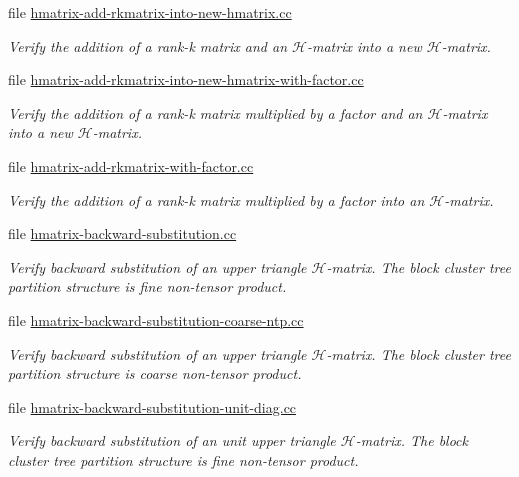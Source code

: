 \begin{DoxyCompactItemize}
file \hyperlink{hmatrix-add-rkmatrix-into-new-hmatrix_8cc}{hmatrix-\/add-\/rkmatrix-\/into-\/new-\/hmatrix.\+cc}
\begin{DoxyCompactList}\small\item\em Verify the addition of a rank-\/k matrix and an $\mathcal{H}$-\/matrix into a new $\mathcal{H}$-\/matrix. \end{DoxyCompactList}\item 
file \hyperlink{hmatrix-add-rkmatrix-into-new-hmatrix-with-factor_8cc}{hmatrix-\/add-\/rkmatrix-\/into-\/new-\/hmatrix-\/with-\/factor.\+cc}
\begin{DoxyCompactList}\small\item\em Verify the addition of a rank-\/k matrix multiplied by a factor and an $\mathcal{H}$-\/matrix into a new $\mathcal{H}$-\/matrix. \end{DoxyCompactList}\item 
file \hyperlink{hmatrix-add-rkmatrix-with-factor_8cc}{hmatrix-\/add-\/rkmatrix-\/with-\/factor.\+cc}
\begin{DoxyCompactList}\small\item\em Verify the addition of a rank-\/k matrix multiplied by a factor into an $\mathcal{H}$-\/matrix. \end{DoxyCompactList}\item 
file \hyperlink{hmatrix-backward-substitution_8cc}{hmatrix-\/backward-\/substitution.\+cc}
\begin{DoxyCompactList}\small\item\em Verify backward substitution of an upper triangle $\mathcal{H}$-\/matrix. The block cluster tree partition structure is fine non-\/tensor product. \end{DoxyCompactList}\item 
file \hyperlink{hmatrix-backward-substitution-coarse-ntp_8cc}{hmatrix-\/backward-\/substitution-\/coarse-\/ntp.\+cc}
\begin{DoxyCompactList}\small\item\em Verify backward substitution of an upper triangle $\mathcal{H}$-\/matrix. The block cluster tree partition structure is coarse non-\/tensor product. \end{DoxyCompactList}\item 
file \hyperlink{hmatrix-backward-substitution-unit-diag_8cc}{hmatrix-\/backward-\/substitution-\/unit-\/diag.\+cc}
\begin{DoxyCompactList}\small\item\em Verify backward substitution of an unit upper triangle $\mathcal{H}$-\/matrix. The block cluster tree partition structure is fine non-\/tensor product. \end{DoxyCompactList}\item 

\end{DoxyCompactItemize}
